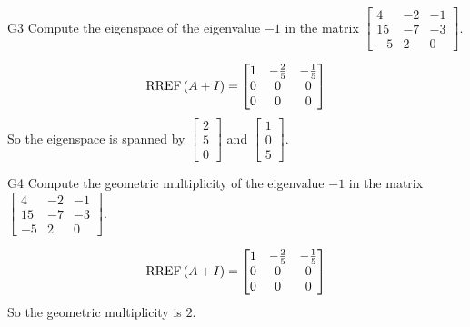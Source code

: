 \documentclass{sbgLAquiz}
\begin{document}
\begin{problem}{G3}
Compute the eigenspace of the eigenvalue $-1$ in the matrix $\begin{bmatrix} 4 & -2 & -1 \\ 15 & -7 & -3 \\ -5 & 2 & 0 \end{bmatrix}$. 
\end{problem}
\begin{solution}
$$\operatorname{RREF}\left(A+I\right) = \begin{bmatrix} 1 & - \frac{2}{5} & -\frac{1}{5} \\ 0 & 0 & 0 \\ 0 & 0 & 0 \end{bmatrix}$$
So the eigenspace is spanned by $\begin{bmatrix} 2 \\5 \\  0 \end{bmatrix}$ and $\begin{bmatrix} 1 \\ 0 \\ 5 \end{bmatrix}$.
\end{solution}


\begin{extract}\newpage\end{extract}
\begin{problem}{G4}
Compute the geometric multiplicity of the eigenvalue $-1$ in the matrix $\begin{bmatrix} 4 & -2 & -1 \\ 15 & -7 & -3 \\ -5 & 2 & 0 \end{bmatrix}$.  \end{problem}
\begin{solution}
$$\operatorname{RREF}\left(A+I\right) = \begin{bmatrix} 1 & - \frac{2}{5} & -\frac{1}{5} \\ 0 & 0 & 0 \\ 0 & 0 & 0 \end{bmatrix}$$
So the geometric multiplicity is $2$.
\end{solution}
\end{document}
